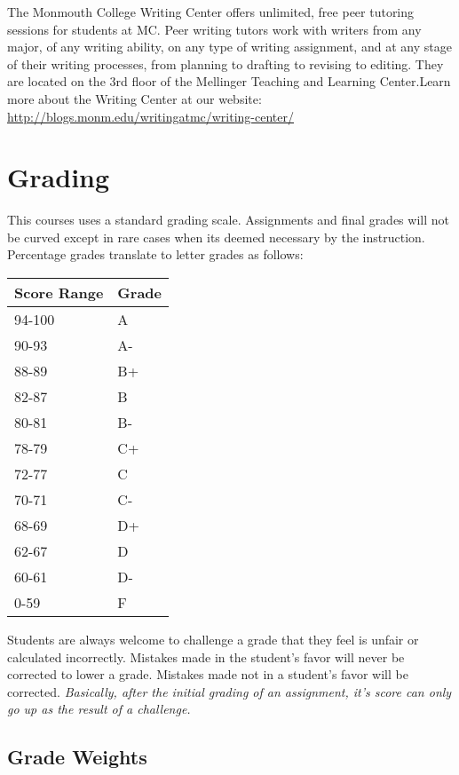 \documentclass[nobib]{tufte-handout}
\begin{document}
The Monmouth College Writing Center offers unlimited, free peer tutoring sessions for students at MC.  Peer writing tutors work with writers from any major, of any writing ability, on any type of writing assignment, and at any stage of their writing processes, from planning to drafting to revising to editing.  They are located on the 3rd floor of the Mellinger Teaching and Learning Center.Learn more about the Writing Center at our website: \url{http://blogs.monm.edu/writingatmc/writing-center/}

\section{Grading}

This courses uses a standard grading scale.  Assignments and final grades will not be curved except in rare cases when its deemed necessary by the instruction.  Percentage grades translate to letter grades as follows:
\newline
\begin{center}
\begin{small}
\begin{tabular}{ll}
Score Range & Grade \\ \hline
94-100 & A \\
90-93 & A- \\
88-89 & B+ \\
82-87 & B \\
80-81 & B- \\
78-79 & C+ \\
72-77 & C \\
70-71 & C- \\
68-69 & D+ \\
62-67 & D \\
60-61 & D- \\
0-59 & F
\end{tabular}
\end{small}
\end{center}


Students are always welcome to challenge a grade that they feel is unfair or calculated incorrectly.  Mistakes made in the student's favor will never be corrected to lower a grade.  Mistakes made not in a student's favor will be corrected.  \textit{Basically, after the initial grading of an assignment, it's score can only go up as the result of a challenge.}


\subsection{Grade Weights}
\end{document}

